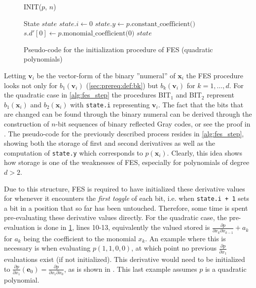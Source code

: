 \begin{figure}[t]
    \begin{alg}
        \caption{INIT($p$, $n$)}\label{alg:fes_init}
        State $state$\;
        $state.i \gets 0$\;
        $state.y \gets p.\text{constant\_coefficient()}$\;
        $s.d'[0] \gets p.\text{monomial\_coefficient(0)}$\;
        \Return $state$\;
    \end{alg}
    \caption{Pseudo-code for the initialization procedure of FES (quadratic polynomials)}
\end{figure}

Letting $\mathbf{v}_i$ be the vector-form of the binary ''numeral'' of $\mathbf{x}_i$ the FES procedure looks not only for $b_1(\mathbf{v}_i)$ (\cref{sec:prereq:def:bk}) but $b_k(\mathbf{v}_i)$ for $k=1,\dots,d$. For the quadratic case in \cref{alg:fes_step} the procedures BIT$_1$ and BIT$_2$ represent $b_1(\mathbf{x}_i)$ and $b_2(\mathbf{x}_i)$ with \texttt{state.i} representing $\mathbf{v}_i$. The fact that the bits that are changed can be found through the binary numeral can be derived through the construction of $n$-bit sequences of binary reflected Gray codes, or see the proof in \cite{tungchoumasters}. The pseudo-code for the previously described process resides in \cref{alg:fes_step}, showing both the storage of first and second derivatives as well as the computation of \texttt{state.y} which corresponds to $p(\mathbf{x}_i)$. Clearly, this idea shows how storage is one of the weaknesses of FES, especially for polynomials of degree $d > 2$. 

Due to this structure, FES is required to have initialized these derivative values for whenever it encounters the \textit{first toggle} of each bit, i.e. when \texttt{state.i + 1} sets a bit in a position that so far has been untouched. Therefore, some time is spent pre-evaluating these derivative values directly. For the quadratic case, the pre-evaluation is done in \cref{alg:fes_init}, lines 10-13, equivalently the valued stored is $\frac{\partial p}{\partial x_k \partial x_{k-1}} + a_k$ for $a_k$ being the coefficient to the monomial $x_k$. An example where this is necessary is when evaluating $p(1,1,0,0)$, at which point no previous $\frac{\partial p}{\partial x_1}$ evaluations exist (if not initialized). This derivative would need to be initialized to $\frac{\partial p}{\partial x_1}(\mathbf{e}_0) = \frac{\partial p}{\partial x_1 \partial x_0}$, as is shown in \cite{tungchoumasters}. This last example assumes $p$ is a quadratic polynomial.

